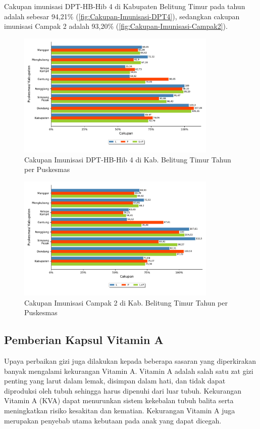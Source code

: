 Cakupan imunisasi DPT-HB-Hib 4 di Kabupaten Belitung Timur pada tahun \tP
adalah sebesar 94,21\% (\autoref{fig:Cakupan-Imunisasi-DPT4}), sedangkan cakupan imunisasi Campak 2 adalah 93,20\% (\autoref{fig:Cakupan-Imunisasi-Campak2}).

\begin{figure}[H]
    \centering
    \includegraphics[width=0.85\textwidth]{bab_05/bab_05_21a_imunDPTlanjut}
    \caption{Cakupan Imunisasi DPT-HB-Hib 4 di Kab. Belitung Timur Tahun \tP per Puskesmas}
    \label{fig:Cakupan-Imunisasi-DPT4}
\end{figure}

\begin{figure}[H]
    \centering
    \includegraphics[width=0.85\textwidth]{bab_05/bab_05_21b_imunCampakLanjut}
    \caption{Cakupan Imunisasi Campak 2 di Kab. Belitung Timur Tahun \tP per Puskesmas}
    \label{fig:Cakupan-Imunisasi-Campak2}
\end{figure}

\subsection{Pemberian Kapsul Vitamin A}
Upaya perbaikan gizi juga dilakukan kepada beberapa sasaran yang diperkirakan
banyak mengalami kekurangan Vitamin A. Vitamin A adalah salah satu
zat gizi penting yang larut dalam lemak, disimpan dalam hati, dan
tidak dapat diproduksi oleh tubuh sehingga harus dipenuhi dari luar
tubuh. Kekurangan Vitamin A (KVA) dapat menurunkan sistem kekebalan
tubuh balita serta meningkatkan risiko kesakitan dan kematian. Kekurangan
Vitamin A juga merupakan penyebab utama kebutaan pada anak yang dapat
dicegah.

